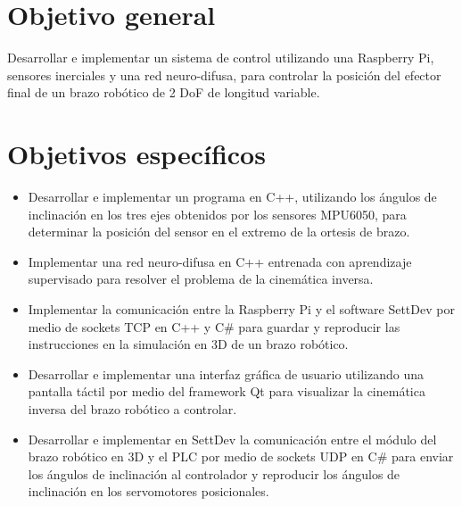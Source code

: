 \section{Objetivo general}

Desarrollar e implementar un sistema de control utilizando una Raspberry Pi, sensores inerciales y una red neuro-difusa, para controlar la posición del efector final de un brazo robótico de 2 DoF de longitud variable.

\newpage
\section{Objetivos específicos}
\begin{itemize}
	
	\item Desarrollar e implementar un programa en C++, utilizando los ángulos de inclinación en los tres ejes obtenidos por los sensores MPU6050, para determinar la posición del sensor en el extremo de la ortesis de brazo.
	
	\item Implementar una red neuro-difusa en C++ entrenada con aprendizaje supervisado para resolver el problema de la cinemática inversa.
	
	\item Implementar la comunicación entre la Raspberry Pi y el software SettDev por medio de sockets TCP en C++ y C\# para guardar y reproducir las instrucciones en la simulación en 3D de un brazo robótico.
	
	\item Desarrollar e implementar una interfaz gráfica de usuario utilizando una pantalla táctil por medio del framework Qt para visualizar la cinemática inversa del brazo robótico a controlar.
	
	\item Desarrollar e implementar en SettDev la comunicación entre el módulo del brazo robótico en 3D y el PLC por medio de sockets UDP en C\# para enviar los ángulos de inclinación al controlador y reproducir los ángulos de inclinación en los servomotores posicionales.
	
\end{itemize}